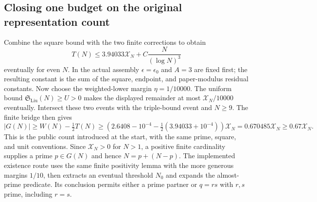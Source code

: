 \subsection{Closing one budget on the original representation count}
Combine the square bound with the two finite corrections to obtain
\[
 T(N)\le3.94033\mathcal X_N+C\frac{N}{(\log N)^3}
\]
eventually for even $N$.  In the actual assembly $\epsilon=\epsilon_0$ and
$A=3$ are fixed first; the resulting constant is the sum of the square,
endpoint, and paper-modulus residual constants.
Now choose the weighted-lower margin $\eta=1/10000$.
The uniform bound $\mathfrak S_{\mathrm{Liu}}(N)\ge U>0$ makes the displayed remainder
at most $\mathcal X_N/10000$ eventually.  Intersect these two events with the
triple-bound event and $N\ge9$.  The finite bridge then gives
\[
 |G(N)|\ge W(N)-\tfrac12T(N)
 \ge\left(2.6408-10^{-4}-\tfrac12(3.94033+10^{-4})\right)\mathcal X_N
 =0.670485\mathcal X_N\ge0.67\mathcal X_N.
\]
This is the public count introduced at the start, with the same prime, square, and unit conventions.
Since $\mathcal X_N>0$ for $N>1$, a positive finite cardinality supplies a prime
$p\in G(N)$ and hence $N=p+(N-p)$.  The implemented existence route uses
the same finite positivity lemma with the more generous margins $1/10$,
then extracts an eventual threshold $N_0$ and expands the almost-prime
predicate.  Its conclusion permits either a prime partner or $q=rs$ with
$r,s$ prime, including $r=s$.
